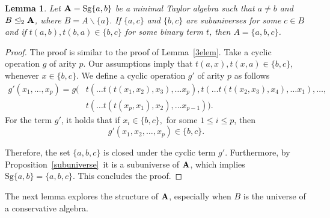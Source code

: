 \documentclass[11pt]{amsart}
\newcommand{\m}[1]{\mathbf{\uppercase{#1}}}
\newtheorem{lem}[thm]{Lemma}
\theoremstyle{definition}
\theoremstyle{remark}
\theoremstyle{plain}
\begin{document}
\begin{lem}\label{triangle}
Let $\m a=\mathrm{Sg}\{a,b\}$ be a minimal Taylor algebra such that $a\neq b$ and $B\trianglelefteq_2 {\m A}$, where $B=A\backslash \{a\}$. If $\{a,c\}$ and $\{b,c\}$ are subuniverses for some $c\in B$ and if $t(a,b),t(b,a)\in \{b,c\}$ for some binary term $t$, then $A=\{a,b,c\}$.
\end{lem}
\begin{proof}
The proof is similar to the proof of Lemma~\ref{3elem}.
Take a cyclic operation $g$ of arity $p$. Our assumptions imply that $t(a,x),t(x,a)\in\{b,c\}$, whenever $x\in \{b,c\}$. We define a cyclic operation $g'$ of arity $p$ as follows
\begin{align*}
g'(x_1,\dotso, x_p) = g(&t(\dotso t(t(x_1,x_2),x_3),\dotso x_p), t(\dotso t(t(x_2,x_3),x_4),\dotso x_1),\dotso ,\\
& t(\dotso t(t(x_p,x_1),x_2),\dotso x_{p-1})).
\end{align*}
For the term $g'$, it holds that if $x_i\in \{b,c\},$ for some $1\leqslant i\leqslant p$, then
$$g'(x_1,x_2,\dotso , x_p)\in \{b,c\}.$$

Therefore, the set $\{a,b,c\}$ is closed under the cyclic term $g'$. Furthermore, by Proposition~\ref{subuniverse}\, it is a subuniverse of $\m A$, which implies $\mathrm{Sg}\{a,b\}=\{a,b,c\}$. This concludes the proof.
\end{proof} 


The next lemma explores the structure of $\m a$, especially when $B$ is the universe of a conservative algebra.
\end{document}
